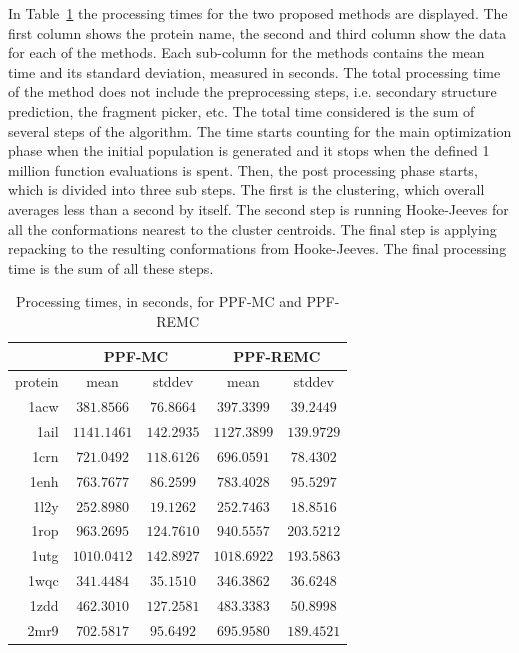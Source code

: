 In Table~\ref{tab:processing-times} the processing times for the two proposed
methods are displayed. The first column shows the protein name, the second and
third column show the data for each of the methods. Each sub-column for the
methods contains the mean time and its standard deviation, measured in seconds.
The total processing time of the method does not include the preprocessing
steps, i.e. secondary structure prediction, the fragment picker, etc. The total
time considered is the sum of several steps of the algorithm. The time starts
counting for the main optimization phase when the initial population is
generated and it stops when the defined 1 million function evaluations is
spent. Then, the post processing phase starts, which is divided into three
sub steps. The first is the clustering, which overall averages less than a
second by itself. The second step is running Hooke-Jeeves for all the
conformations nearest to the cluster centroids. The final step is applying
repacking to the resulting conformations from Hooke-Jeeves. The final
processing time is the sum of all these steps.

\begin{table}
  \centering
  \begin{tabular}{r|c|c||c|c}
            & \multicolumn{2}{c}{PPF-MC} & \multicolumn{2}{||c}{PPF-REMC} \\ \hline
    protein & mean & stddev & mean & stddev \\ \hline \hline
    1acw & $ 381.8566$ & $ 76.8664$ & $ 397.3399$ & $ 39.2449$ \\ \hline
    1ail & $1141.1461$ & $142.2935$ & $1127.3899$ & $139.9729$ \\ \hline
    1crn & $ 721.0492$ & $118.6126$ & $ 696.0591$ & $ 78.4302$ \\ \hline
    1enh & $ 763.7677$ & $ 86.2599$ & $ 783.4028$ & $ 95.5297$ \\ \hline
    1l2y & $ 252.8980$ & $ 19.1262$ & $ 252.7463$ & $ 18.8516$ \\ \hline
    1rop & $ 963.2695$ & $124.7610$ & $ 940.5557$ & $203.5212$ \\ \hline
    1utg & $1010.0412$ & $142.8927$ & $1018.6922$ & $193.5863$ \\ \hline
    1wqc & $ 341.4484$ & $ 35.1510$ & $ 346.3862$ & $ 36.6248$ \\ \hline
    1zdd & $ 462.3010$ & $127.2581$ & $ 483.3383$ & $ 50.8998$ \\ \hline
    2mr9 & $ 702.5817$ & $ 95.6492$ & $ 695.9580$ & $189.4521$ \\ \hline
  \end{tabular}
  \caption{Processing times, in seconds, for PPF-MC and PPF-REMC}
  \label{tab:processing-times}
\end{table}

